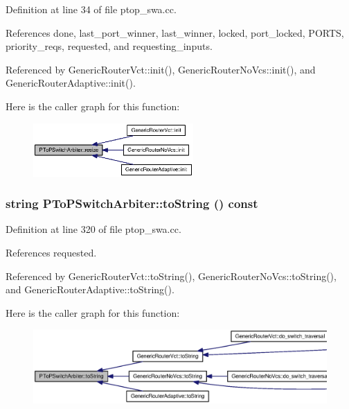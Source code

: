 Definition at line 34 of file ptop\_\-swa.cc.

References done, last\_\-port\_\-winner, last\_\-winner, locked, port\_\-locked, PORTS, priority\_\-reqs, requested, and requesting\_\-inputs.

Referenced by GenericRouterVct::init(), GenericRouterNoVcs::init(), and GenericRouterAdaptive::init().

Here is the caller graph for this function:\nopagebreak
\begin{figure}[H]
\begin{center}
\leavevmode
\includegraphics[width=173pt]{classPToPSwitchArbiter_73fb7254a91aeeb209fa3225f09b1847_icgraph}
\end{center}
\end{figure}
\subsubsection[{toString}]{\setlength{\rightskip}{0pt plus 5cm}string PToPSwitchArbiter::toString () const}\label{classPToPSwitchArbiter_f85a552b1be155e2717c197a51799414}




Definition at line 320 of file ptop\_\-swa.cc.

References requested.

Referenced by GenericRouterVct::toString(), GenericRouterNoVcs::toString(), and GenericRouterAdaptive::toString().

Here is the caller graph for this function:\nopagebreak
\begin{figure}[H]
\begin{center}
\leavevmode
\includegraphics[width=420pt]{classPToPSwitchArbiter_f85a552b1be155e2717c197a51799414_icgraph}
\end{center}
\end{figure}



